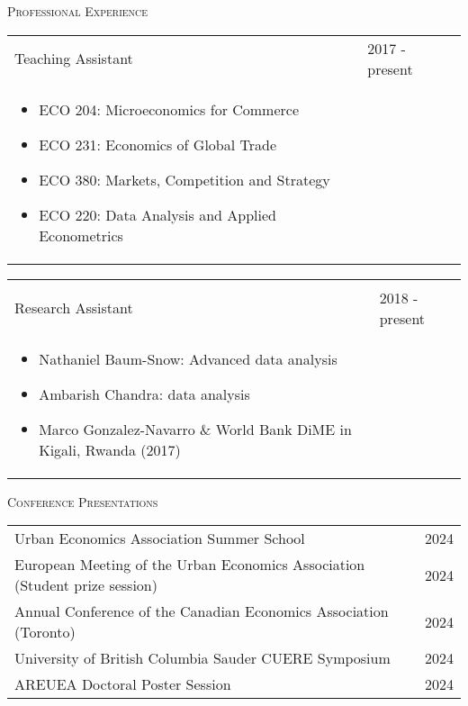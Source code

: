 \documentclass[11pt]{amsart}
\begin{document}
\vspace{0.4cm}

\LARGE
\textsc{Professional Experience}
\vspace{0.2cm}
\normalsize

\begin{tabular}{ p{12.5cm} p{5cm}}
Teaching Assistant & 2017 - present \\
\begin{itemize}
  \item ECO 204: Microeconomics for Commerce
  \item ECO 231: Economics of Global Trade
  \item ECO 380: Markets, Competition and Strategy
  \item ECO 220: Data Analysis and Applied Econometrics
\end{itemize} 
                   &                
\end{tabular}

\begin{tabular}{ p{12.5cm} p{5cm}}
                   &             \\
Research Assistant & 2018 - present \\
\begin{itemize}
  \item Nathaniel Baum-Snow: Advanced data analysis 
  \item Ambarish Chandra: data analysis
  \item Marco Gonzalez-Navarro \& World Bank DiME in Kigali, Rwanda (2017)
\end{itemize}      &             


\end{tabular}





\normalsize

\vspace{0.4cm}
\LARGE
\textsc{Conference Presentations}
\vspace{0.2cm}
\normalsize

\begin{tabular}{ p{12.5cm} p{5cm}}
Urban Economics Association Summer School & 2024 \\	
European Meeting of the Urban Economics Association (Student prize session) &				 2024 \\
Annual Conference of the Canadian Economics Association (Toronto)     & 2024 \\
University of British Columbia Sauder CUERE Symposium                   & 2024 \\
AREUEA Doctoral Poster Session & 2024 \\
\end{tabular}
\end{document}
